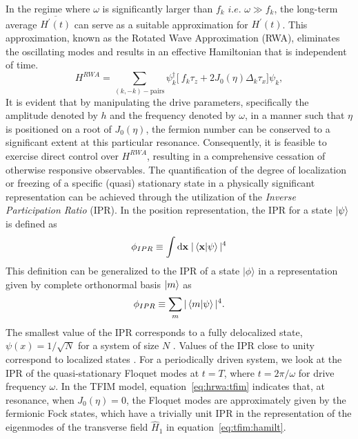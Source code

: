 \documentclass[%
reprint,
superscriptaddress,
amsmath,amssymb,
aps,
prb,
]{revtex4-2}
\begin{document}
	In the regime where $\omega$ is significantly larger than $f_k$ $i.e.$  $\omega \gg f_k$, the long-term average $\overline{H^\prime(t)}$ can serve as a suitable approximation for $H^\prime(t)$. This approximation, known as the Rotated Wave Approximation (RWA), eliminates the oscillating modes and results in an effective Hamiltonian that is independent of time.
	\begin{equation}
		\label{eq:hrwa:tfim}
		H^{RWA} = \sum_{(k,-k)-\mbox{pairs}} \psi^\dagger_k
		\bigg[\ f_k\tau_z + 2 J_0(\eta) \Delta_k\tau_x \bigg]\psi_k,
	\end{equation}
	It is evident that by manipulating the drive parameters, specifically the amplitude denoted by $h$ and the frequency denoted by $\omega$, in a manner such that $\eta$ is positioned on a root of $J_0(\eta)$, the fermion number can be conserved to a significant extent at this particular resonance. Consequently, it is feasible to exercise direct control over $H^{RWA}$, resulting in a comprehensive cessation of otherwise responsive observables. The quantification of the degree of localization or freezing of a specific (quasi) stationary state in a physically significant representation can be achieved through the utilization of the \emph{Inverse Participation Ratio} (IPR).  In the position representation, the IPR for a state $\ket{\psi}$  \cite{mukherjee_modulation-assisted_2015,lin_many-body_2018,murphy_generalized_2011, torres-herrera_self-averaging_2020} is defined as
	\begin{equation*}
		\phi_{IPR}\equiv \int \mathrm{d}\mathbf{x}\;\vert\ip{\mathbf{x}}{\psi}\vert^4
	\end{equation*}
	This definition can be generalized to the IPR of a state $|\phi\rangle$ in a representation given by complete orthonormal basis $\ket{m}$ as 
	\begin{equation}
	\label{eq:ipr:defn}
	\phi_{IPR} \equiv \sum_m\vert\ip{m}{\psi}\vert^4.
	\end{equation}
	The smallest value of the IPR corresponds to a fully delocalized state, $\psi(x)=1/\sqrt{N}$ for a system of size $N$ \cite{torres-herrera_self-averaging_2020,trivedi_can_2005}. Values of the IPR close to unity correspond to localized states \cite{misguich_inverse_2016}. For a periodically driven system, we look at the IPR of the quasi-stationary Floquet modes at $t=T$, where $t=2\pi/\omega$ for drive frequency $\omega$. In the TFIM model, equation~\ref{eq:hrwa:tfim} indicates that, at resonance, when $J_0(\eta)=0$, the Floquet modes are approximately given by the fermionic Fock states, which have a trivially unit IPR in the representation of the eigenmodes of the transverse field $\hat{H}_1$ in equation~\ref{eq:tfim:hamilt}.
		
\end{document}
